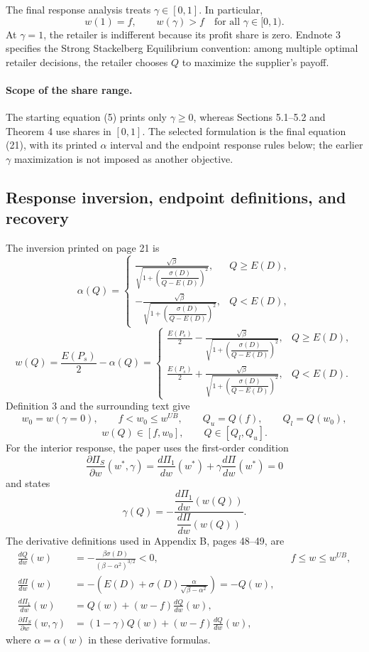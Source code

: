\documentclass{article}
\begin{document}
The final response analysis treats $\gamma\in[0,1]$. In particular,
\[
w(1)=f,\qquad w(\gamma)>f\quad\text{for all }\gamma\in[0,1).
\]
At $\gamma=1$, the retailer is indifferent because its profit share is zero. Endnote 3 specifies the Strong Stackelberg Equilibrium convention: among multiple optimal retailer decisions, the retailer chooses $Q$ to maximize the supplier's payoff.

\paragraph{Scope of the share range.}
The starting equation (5) prints only $\gamma\geq0$, whereas Sections 5.1--5.2 and Theorem 4 use shares in $[0,1]$. The selected formulation is the final equation (21), with its printed $\alpha$ interval and the endpoint response rules below; the earlier $\gamma$ maximization is not imposed as another objective.

\subsection*{Response inversion, endpoint definitions, and recovery}
The inversion printed on page 21 is
\[
\alpha(Q)=
\begin{cases}
\displaystyle\frac{\sqrt{\beta}}{\sqrt{1+\left(\dfrac{\sigma(D)}{Q-E(D)}\right)^2}},&Q\geq E(D),\\[6pt]
\displaystyle-\frac{\sqrt{\beta}}{\sqrt{1+\left(\dfrac{\sigma(D)}{Q-E(D)}\right)^2}},&Q<E(D),
\end{cases}
\]
\[
w(Q)=\frac{E(P_s)}2-\alpha(Q)=
\begin{cases}
\displaystyle\frac{E(P_s)}2-\frac{\sqrt{\beta}}{\sqrt{1+\left(\dfrac{\sigma(D)}{Q-E(D)}\right)^2}},&Q\geq E(D),\\[6pt]
\displaystyle\frac{E(P_s)}2+\frac{\sqrt{\beta}}{\sqrt{1+\left(\dfrac{\sigma(D)}{Q-E(D)}\right)^2}},&Q<E(D).
\end{cases}
\]
Definition 3 and the surrounding text give
\[
w_0=w(\gamma=0),\qquad f<w_0\leq w^{UB},\qquad
Q_u=Q(f),\qquad Q_l=Q(w_0),
\]
\[
w(Q)\in[f,w_0],\qquad Q\in[Q_l,Q_u].
\]
For the interior response, the paper uses the first-order condition
\[
\frac{\partial\Pi_S}{\partial w}(w^*,\gamma)
=\frac{d\Pi_1}{dw}(w^*)+\gamma\frac{d\Pi}{dw}(w^*)=0
\]
and states
\begin{equation}
\gamma(Q)=-\frac{\dfrac{d\Pi_1}{dw}(w(Q))}
{\dfrac{d\Pi}{dw}(w(Q))}.
\tag{20}
\end{equation}
The derivative definitions used in Appendix B, pages 48--49, are
\begin{align}
\frac{dQ}{dw}(w)&=-\frac{\beta\sigma(D)}{(\beta-\alpha^2)^{3/2}}<0,
&&f\leq w\leq w^{UB},\tag{48}\\
\frac{d\Pi}{dw}(w)&=-\left(E(D)+\sigma(D)\frac{\alpha}{\sqrt{\beta-\alpha^2}}\right)=-Q(w),\tag{49}\\
\frac{d\Pi_1}{dw}(w)&=Q(w)+(w-f)\frac{dQ}{dw}(w),\tag{50}\\
\frac{\partial\Pi_S}{\partial w}(w,\gamma)&=(1-\gamma)Q(w)+(w-f)\frac{dQ}{dw}(w),\tag{51}
\end{align}
where $\alpha=\alpha(w)$ in these derivative formulas.
\end{document}
